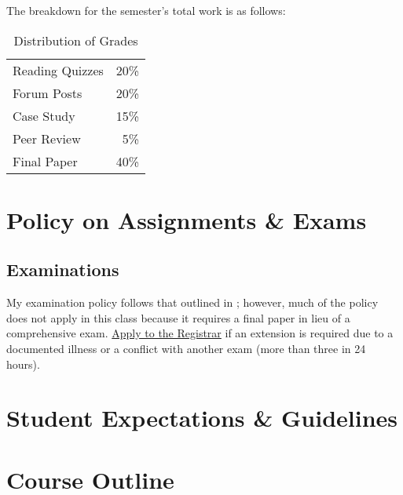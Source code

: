 \documentclass[titlepage]{article}
\newcommand\policy{../policy}
\begin{document}
The breakdown for the semester's total work is as follows:

\begin{table}[htbp]
  \centering
  {\lining
  \begin{tabular}{lr}
    \toprule
    Reading Quizzes & 20\% \\
    Forum Posts     & 20\% \\
    Case Study      & 15\% \\
    Peer Review     &  5\% \\
    Final Paper     & 40\% \\
    \bottomrule
  \end{tabular}}
  \caption{Distribution of Grades}
  \label{distribution}
\end{table}



\section{Policy on Assignments \& Exams}
\label{policy}



%
\subsection{Examinations}
\label{exams}

My examination policy follows that outlined in \SecAC; however, much of
the policy does not apply in this class because it requires a final
paper in lieu of a comprehensive exam.
\href{http://www.tyndale.ca/registrar/final-exam-schedule-and-policies}
{Apply to the Registrar} if an extension is required due to a documented
illness or a conflict with another exam (more than three in 24 hours).

\section{Student Expectations \& Guidelines}
\label{expectations}







\section{Course Outline}
\label{outline}
\end{document}
